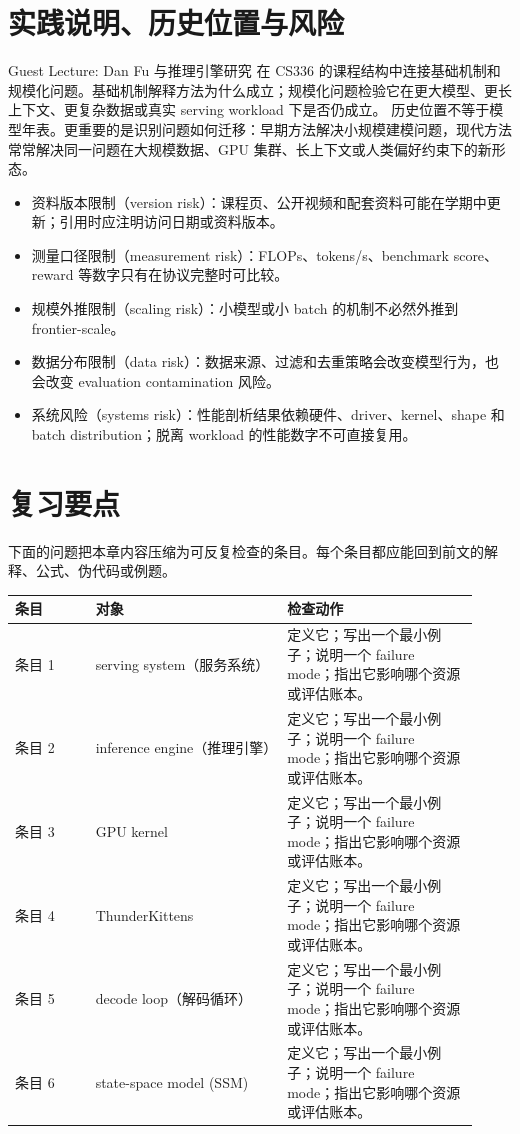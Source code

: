 \documentclass[a4paper]{article}
\begin{document}
\section{实践说明、历史位置与风险}
Guest Lecture: Dan Fu 与推理引擎研究 在 CS336 的课程结构中连接基础机制和规模化问题。基础机制解释方法为什么成立；规模化问题检验它在更大模型、更长上下文、更复杂数据或真实 serving workload 下是否仍成立。
历史位置不等于模型年表。更重要的是识别问题如何迁移：早期方法解决小规模建模问题，现代方法常常解决同一问题在大规模数据、GPU 集群、长上下文或人类偏好约束下的新形态。
\begin{itemize}
\item 资料版本限制（version risk）：课程页、公开视频和配套资料可能在学期中更新；引用时应注明访问日期或资料版本。
\item 测量口径限制（measurement risk）：FLOPs、tokens/s、benchmark score、reward 等数字只有在协议完整时可比较。
\item 规模外推限制（scaling risk）：小模型或小 batch 的机制不必然外推到 frontier-scale。
\item 数据分布限制（data risk）：数据来源、过滤和去重策略会改变模型行为，也会改变 evaluation contamination 风险。
\item 系统风险（systems risk）：性能剖析结果依赖硬件、driver、kernel、shape 和 batch distribution；脱离 workload 的性能数字不可直接复用。
\end{itemize}
\section{复习要点}
下面的问题把本章内容压缩为可反复检查的条目。每个条目都应能回到前文的解释、公式、伪代码或例题。
\begin{longtable}{p{0.16\linewidth}p{0.38\linewidth}p{0.38\linewidth}}
\toprule
\textbf{条目} & \textbf{对象} & \textbf{检查动作}\\
\midrule
条目 1 & serving system（服务系统） & 定义它；写出一个最小例子；说明一个 failure mode；指出它影响哪个资源或评估账本。\\
条目 2 & inference engine（推理引擎） & 定义它；写出一个最小例子；说明一个 failure mode；指出它影响哪个资源或评估账本。\\
条目 3 & GPU kernel & 定义它；写出一个最小例子；说明一个 failure mode；指出它影响哪个资源或评估账本。\\
条目 4 & ThunderKittens & 定义它；写出一个最小例子；说明一个 failure mode；指出它影响哪个资源或评估账本。\\
条目 5 & decode loop（解码循环） & 定义它；写出一个最小例子；说明一个 failure mode；指出它影响哪个资源或评估账本。\\
条目 6 & state-space model (SSM) & 定义它；写出一个最小例子；说明一个 failure mode；指出它影响哪个资源或评估账本。\\
\bottomrule
\end{longtable}
\end{document}
